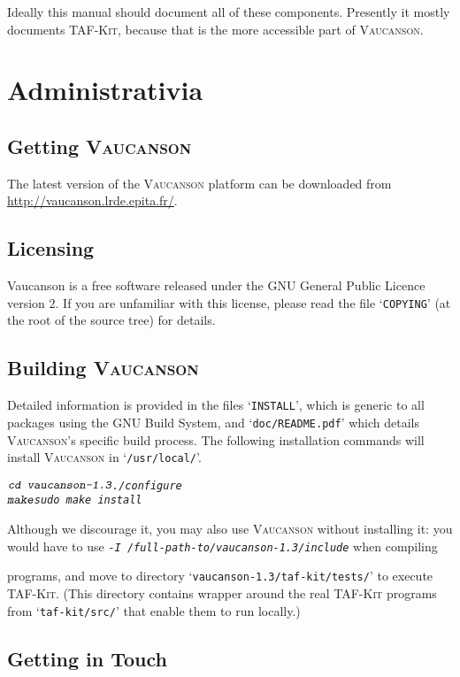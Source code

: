 \documentclass[a4paper]{report}
\makeatletter
\newcommand{\Cxx}{%
  \valign{\vfil\hbox{##}\vfil\cr
    {C\kern-.1em}\cr
    $\hbox{\fontsize\sf@size\z@\textbf{+\kern-0.05em+}}$\cr}%
    \xspace
}
\newenvironment{shell}
{\begin{alltt}}
{\end{alltt}}
\def\VcsnVersion{1.3}
\newcommand\kbd[1]{\textsl{\texttt{#1}}}
\newcommand\file[1]{`\texttt{#1}'}
\newcommand{\tafkit}{\textsc{TAF-Kit}\xspace}
\newcommand{\Vauc}{\textsc{Vaucanson}\xspace}
\makeatother
\begin{document}
Ideally this manual should document all of these components.
Presently it mostly documents \tafkit, because that is the more
accessible part of \Vauc.


\chapter{Administrativia}

\section{Getting \Vauc}

The latest version of the \Vauc platform can be downloaded from
\url{http://vaucanson.lrde.epita.fr/}.

\section{Licensing}

Vaucanson is a free software released under the GNU General Public
Licence version 2. If you are unfamiliar with this license, please
read the file \file{COPYING} (at the root of the source tree) for
details.

\section{Building \Vauc}\label{sec:building}

Detailed information is provided in the files \file{INSTALL}, which is
generic to all packages using the GNU Build System, and
\file{doc/README.pdf} which details \Vauc's specific build process.
The following installation commands will install \Vauc in
\file{/usr/local/}.

\begin{shell}
$ \kbd{cd vaucanson-\VcsnVersion}
$ \kbd{./configure}
$ \kbd{make}
$ \kbd{sudo make install}
\end{shell}

Although we discourage it, you may also use \Vauc without installing
it: you would have to use \kbd{-I
  /full-path-to/vaucanson-\VcsnVersion/include} when compiling \Cxx
programs, and move to directory
\file{vaucanson-\VcsnVersion/taf-kit/tests/} to execute \tafkit.
(This directory contains wrapper around the real \tafkit programs from
\file{taf-kit/src/} that enable them to run locally.)

\section{Getting in Touch}
\end{document}
